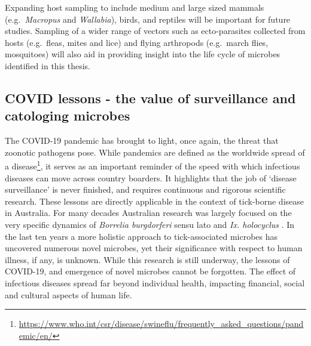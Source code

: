 \documentclass[a4paper, nobind]{templates/ociamthesis}
\begin{document}
Expanding host sampling to include medium and large sized mammals (e.g.~\emph{Macropus} and \emph{Wallabia}), birds, and reptiles will be important for future studies.
Sampling of a wider range of vectors such as ecto-parasites collected from hosts (e.g.~fleas, mites and lice) and flying arthropods (e.g.~march flies, mosquitoes) will also aid in providing insight into the life cycle of microbes identified in this thesis.

\hypertarget{covid-lessons---the-value-of-surveillance-and-catologing-microbes}{%
\subsection{COVID lessons - the value of surveillance and catologing microbes}\label{covid-lessons---the-value-of-surveillance-and-catologing-microbes}}

The COVID-19 pandemic has brought to light, once again, the threat that zoonotic pathogens pose.
While pandemics are defined as the worldwide spread of a disease\footnote{\url{https://www.who.int/csr/disease/swineflu/frequently_asked_questions/pandemic/en/}}, it serves as an important reminder of the speed with which infectious diseases can move across country boarders.
It highlights that the job of `disease surveillance' is never finished, and requires continuous and rigorous scientific research.
These lessons are directly applicable in the context of tick-borne disease in Australia.
For many decades Australian research was largely focused on the very specific dynamics of \emph{Borrelia burgdorferi} sensu lato and \emph{Ix. holocyclus} \autocite{chaladaThereLymelikeDisease2016}.
In the last ten years a more holistic approach to tick-associated microbes has uncovered numerous novel microbes, yet their significance with respect to human illness, if any, is unknown.
While this research is still underway, the lessons of COVID-19, and emergence of novel microbes cannot be forgotten.
The effect of infectious diseases spread far beyond individual health, impacting financial, social and cultural aspects of human life.
\end{document}
